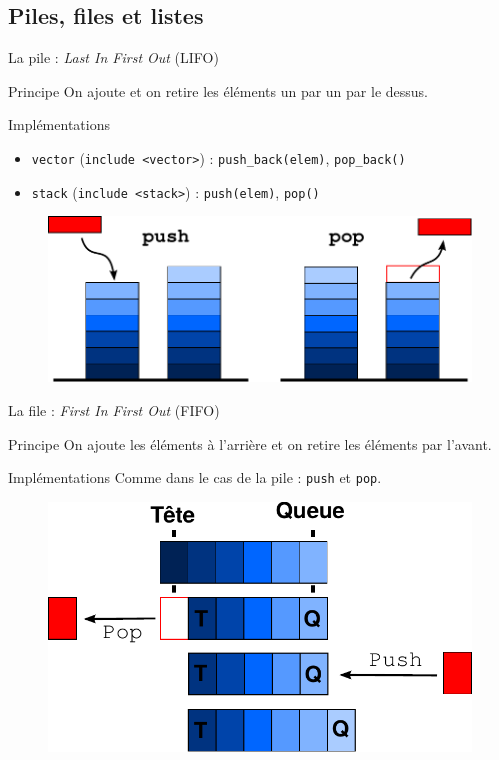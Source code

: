 \subsection{Piles, files et listes}
\begin{frame}{La pile : \textit{Last In First Out} (LIFO)}
\begin{block}{Principe}
On ajoute et on retire les éléments un par un par le dessus.
\end{block}

\begin{exampleblock}{Implémentations}
\begin{itemize}
    \item \texttt{vector} (\texttt{include <vector>}) : \texttt{push_back(elem)}, \texttt{pop_back()}
    \item \texttt{stack} (\texttt{include <stack>}) : \texttt{push(elem)}, \texttt{pop()}
\end{itemize}
\end{exampleblock}

\begin{figure}[ht!]
  \centering
  \includegraphics[width=0.5\linewidth]{./images/pile.pdf}
\end{figure}
\end{frame}



\begin{frame}{La file : \textit{First In First Out} (FIFO)}
\begin{block}{Principe}
On ajoute les éléments à l'arrière et on retire les éléments par l'avant.
\end{block}
\begin{exampleblock}{Implémentations}
Comme dans le cas de la pile : \texttt{push} et \texttt{pop}.
\end{exampleblock}

\begin{figure}[ht!]
  \centering
  \includegraphics[width = 0.5 \linewidth]{./images/file.pdf}
\end{figure}

\end{frame}

